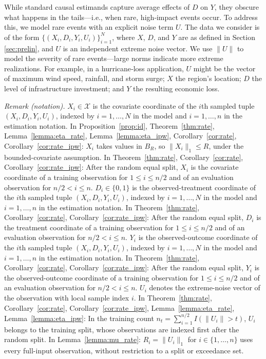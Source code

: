 \documentclass[12pt]{article}
\theoremstyle{plain}
\theoremstyle{definition}
\begin{document}
While standard causal estimands capture average effects of $D$ on $Y$, they obscure what happens in the tails—i.e., when rare, high‐impact events occur.  To address this, we model rare events with an explicit noise term $U$. The data we consider is of the form $\{(X_i, D_i, Y_i, U_i)\}_{i = 1}^N$, where $X$, $D$, and $Y$ are as defined in Section \ref{sec:prelin}, and $U$ is an independent extreme noise vector.  We use $\|U\|$ to model the severity of rare events—large norms indicate more extreme realizations.  For example, in a hurricane‐loss application, $U$ might be the vector of maximum wind speed, rainfall, and storm surge; $X$ the region’s location; $D$ the level of infrastructure investment; and $Y$ the resulting economic loss.

\noindent\textit{Remark (notation).} $X_i\in\mathcal{X}$ is the covariate coordinate of the $i$th sampled tuple $(X_i,D_i,Y_i,U_i)$, indexed by $i=1,\ldots,N$ in the model and $i=1,\ldots,n$ in the estimation notation. In Proposition~\ref{prop:id}, Theorem~\ref{thm:rate}, Lemma~\ref{lemma:eta_rate}, Lemma~\ref{lemma:eta_ipw}, Corollary~\ref{cor:rate}, Corollary~\ref{cor:rate_ipw}: $X_i$ takes values in $B_R$, so $\|X_i\|_1\leq R$, under the bounded-covariate assumption. In Theorem~\ref{thm:rate}, Corollary~\ref{cor:rate}, Corollary~\ref{cor:rate_ipw}: After the random equal split, $X_i$ is the covariate coordinate of a training observation for $1\leq i\leq n/2$ and of an evaluation observation for $n/2<i\leq n$. $D_i\in\{0,1\}$ is the observed-treatment coordinate of the $i$th sampled tuple $(X_i,D_i,Y_i,U_i)$, indexed by $i=1,\ldots,N$ in the model and $i=1,\ldots,n$ in the estimation notation. In Theorem~\ref{thm:rate}, Corollary~\ref{cor:rate}, Corollary~\ref{cor:rate_ipw}: After the random equal split, $D_i$ is the treatment coordinate of a training observation for $1\leq i\leq n/2$ and of an evaluation observation for $n/2<i\leq n$. $Y_i$ is the observed-outcome coordinate of the $i$th sampled tuple $(X_i,D_i,Y_i,U_i)$, indexed by $i=1,\ldots,N$ in the model and $i=1,\ldots,n$ in the estimation notation. In Theorem~\ref{thm:rate}, Corollary~\ref{cor:rate}, Corollary~\ref{cor:rate_ipw}: After the random equal split, $Y_i$ is the observed-outcome coordinate of a training observation for $1\leq i\leq n/2$ and of an evaluation observation for $n/2<i\leq n$. $U_i$ denotes the extreme-noise vector of the observation with local sample index $i$. In Theorem~\ref{thm:rate}, Corollary~\ref{cor:rate}, Corollary~\ref{cor:rate_ipw}, Lemma~\ref{lemma:eta_rate}, Lemma~\ref{lemma:eta_ipw}: In the training count $n_t=\sum_{i=1}^{n/2}I(\|U_i\|>t)$, $U_i$ belongs to the training split, whose observations are indexed first after the random split. In Lemma~\ref{lemma:mu_rate}: $R_i=\|U_i\|_1$ for $i\in\{1,\ldots,n\}$ uses every full-input observation, without restriction to a split or exceedance set.
\end{document}
